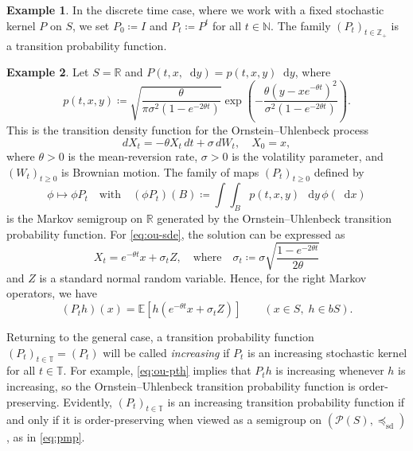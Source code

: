 \documentclass[12pt,reqno]{amsart}
\numberwithin{equation}{section}
\theoremstyle{definition}
\newtheorem{example}{Example}[section]
\newcommand{\1}{\mathbbm{1}}
\newcommand{\RR}{\mathbb{R}}
\newcommand{\NN}{\mathbb{N}}
\newcommand{\ZZ}{\mathbb{Z}}
\newcommand{\diff}{\mathop{}\!\mathrm{d}}
\newcommand{\EE}{\mathbb E}
\newcommand{\TT}{\mathbb T}
\newcommand{\pP}{\mathscr{P}}
\newcommand{\precsd}{\preceq_{\textrm{sd}}}
\newcommand{\navy}[1]{\textit{\textcolor{blue!40!black}{#1}}}
\begin{document}
\begin{example}
    In the discrete time case, where we work with a fixed stochastic kernel $P$
    on $S$, we set $P_0 \coloneq I$ and $P_t \coloneq P^t$ for all $t \in \NN$.  The family
    $(P_t)_{t \in \ZZ_+}$ is a transition probability function.
\end{example}


\begin{example}
    Let $S=\RR$ and $P(t, x, \diff y) = p(t, x, y) \diff y$, where
    \begin{equation*}
        p(t,x, y) \coloneq 
        \sqrt{\frac{\theta}{\pi \sigma^2 (1 - e^{-2\theta t})}} 
        \exp\left(
                -\frac{\theta(y - x e^{-\theta t})^2}{\sigma^2(1 - e^{-2\theta t})}
            \right).
    \end{equation*}
    This is the transition density function for the Ornstein--Uhlenbeck process
    \begin{equation}\label{eq:ou-sde}
        dX_t = -\theta X_t \, dt + \sigma \, dW_t, \quad X_0 = x,
    \end{equation}
    where $\theta > 0$ is the mean-reversion rate, $\sigma > 0$ is the volatility
    parameter, and $(W_t)_{t \geq 0}$ is Brownian motion.  The family of maps
    $(P_t)_{t \geq 0}$ defined by 
    \begin{equation*}
        \phi \mapsto \phi P_t
        \quad \text{with} 
        \quad
        (\phi P_t) (B)  \coloneq \int \int_B p(t, x, y) \, \diff y \, \phi(\diff x)    
    \end{equation*}
    is the Markov semigroup on $\RR$ generated by the Ornstein--Uhlenbeck transition
    probability function.  For \eqref{eq:ou-sde}, the solution can be expressed
    as
    \begin{equation}\label{eq:ou-sol}
        X_t = e^{-\theta t} x + \sigma_t Z,
        \quad \text{where} \quad
        \sigma_t \coloneq \sigma \sqrt{\frac{1 - e^{-2\theta t}}{2\theta}}
    \end{equation}
    and $Z$ is a standard normal random variable. Hence, for the right Markov
    operators, we have
    \begin{equation}\label{eq:ou-pth}
        (P_t h)(x) = \EE [h(e^{-\theta t} x + \sigma_t Z)]
        \qquad (x \in S, \; h \in bS).
    \end{equation}
\end{example}

Returning to the general case, a transition probability function $(P_t)_{t \in \TT} = (P_t)$ will be called
\navy{increasing} if $P_t$ is an increasing stochastic kernel for all $t \in
\TT$.  For example, \eqref{eq:ou-pth} implies that $P_t h$ is increasing
whenever $h$ is increasing, so the Ornstein--Uhlenbeck transition probability
function is order-preserving. Evidently, $(P_t)_{t \in \TT}$ is an increasing
transition probability function if and only if it is
order-preserving when viewed as a semigroup on $(\pP(S), \precsd)$, as in
\eqref{eq:pmp}.
\end{document}
